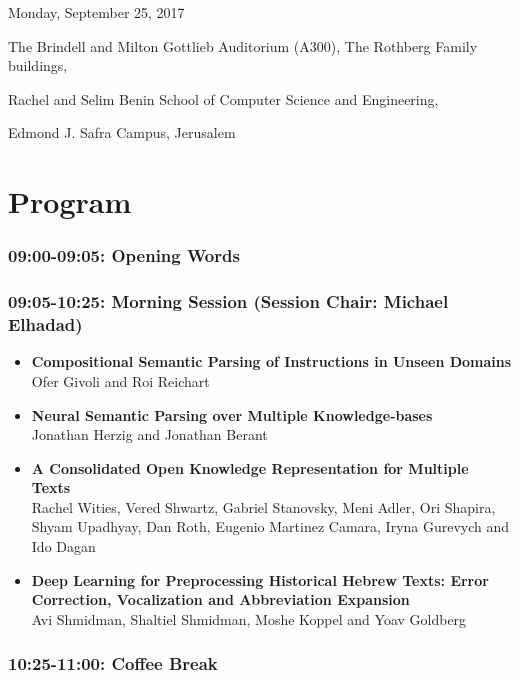 \documentclass[a0,portrait]{a0poster}
\begin{document}
\begin{minipage}{.77\textwidth}
{\fontsize{60pt}{70pt}\selectfont
Monday, September 25, 2017

\fontsize{40pt}{60pt}\selectfont
The Brindell and Milton Gottlieb Auditorium (A300), The Rothberg Family buildings,

Rachel and Selim Benin School of Computer Science and Engineering,

Edmond J. Safra Campus, Jerusalem

}

\part*{Program}

\section*{09:00-09:05: Opening Words}

\section*{09:05-10:25: Morning Session (Session Chair: Michael Elhadad)}

\begin{itemize}
\item\LARGE
\textbf{Compositional Semantic Parsing of Instructions in Unseen
Domains}\\
\Large Ofer Givoli and Roi Reichart
\item\LARGE
\textbf{Neural Semantic Parsing over Multiple Knowledge-bases}\\
\Large Jonathan Herzig and Jonathan Berant
\item\LARGE
\textbf{A Consolidated Open Knowledge Representation for Multiple
Texts}\\
\Large Rachel Wities, Vered Shwartz, Gabriel Stanovsky, Meni Adler, Ori
Shapira, Shyam Upadhyay, Dan Roth, Eugenio Martinez Camara, Iryna
Gurevych and Ido Dagan
\item\LARGE
\textbf{Deep Learning for Preprocessing Historical Hebrew Texts: Error
Correction, Vocalization and Abbreviation Expansion}\\
\Large Avi Shmidman, Shaltiel Shmidman, Moshe Koppel and Yoav Goldberg
\end{itemize}

\section*{10:25-11:00: Coffee Break}
\end{minipage}
\end{document}
